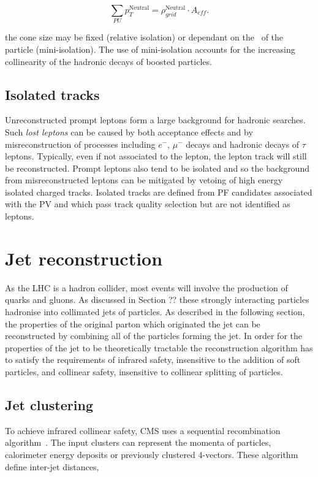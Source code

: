 \begin{equation}
\sum_{PU}p_T^{\text{Neutral}} = \rho_{grid}^{\text{Neutral}}\cdot A_{eff}.
\end{equation}

the cone size may be fixed (relative isolation) or dependant on the \pt~of the particle (mini-isolation). The use of mini-isolation
accounts for the increasing collinearity of the hadronic decays of boosted particles. 

\subsection{Isolated tracks}

Unreconstructed prompt leptons form a large background for hadronic searches.
Such \emph{lost leptons} can be caused by both acceptance effects and by misreconstruction of 
processes including $e^{-}$, $\mu^{-}$ decays and hadronic decays of $\tau$ leptons. 
Typically, even if not associated to the lepton, the lepton track will still be
reconstructed. Prompt leptons also tend to be isolated and so the background
from misreconstructed leptons can be mitigated by vetoing of high
energy isolated charged tracks. Isolated tracks are defined from PF candidates associated with the PV and 
which pass track quality selection but are not identified as leptons.

\section{Jet reconstruction} 
\label{sec:jet_reco}
As the LHC is a hadron collider, most events will involve the production of quarks and gluons. As discussed in
Section ?? these strongly interacting particles hadronise into collimated jets of particles. As described 
in the following section, the properties of the original parton which originated the
jet can be reconstructed by combining all of the particles forming the jet. In order for the properties of the jet to be theoretically tractable the
reconstruction algorithm has to satisfy the requirements of infrared safety, insensitive to the addition of 
soft particles, and collinear safety, insensitive to collinear splitting of particles.

\subsection{Jet clustering}

To achieve infrared collinear safety, CMS uses a sequential recombination algorithm~\cite{antikt}. The input clusters can represent
the momenta of particles, calorimeter energy deposits or previously clustered
4-vectors. These algorithm define inter-jet distances,

